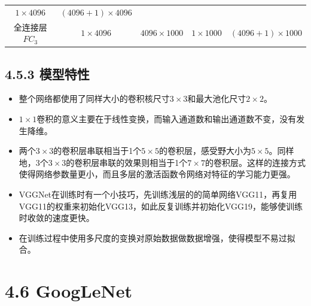 \begin{longtable}[]{ ccccc }
\begin{minipage}[t]{0.16\columnwidth}
\(1\times4096\)\strut
\end{minipage} & \begin{minipage}[t]{0.22\columnwidth}\centering\strut
\((4096+1)\times4096\)\strut
\end{minipage}\tabularnewline
\begin{minipage}[t]{0.16\columnwidth}\centering\strut
全连接层\(FC_{3}\)\strut
\end{minipage} & \begin{minipage}[t]{0.15\columnwidth}\centering\strut
\(1\times4096\)\strut
\end{minipage} & \begin{minipage}[t]{0.17\columnwidth}\centering\strut
\(4096\times1000\)\strut
\end{minipage} & \begin{minipage}[t]{0.16\columnwidth}\centering\strut
\(1\times1000\)\strut
\end{minipage} & \begin{minipage}[t]{0.22\columnwidth}\centering\strut
\((4096+1)\times1000\)\strut
\end{minipage}\tabularnewline
\bottomrule
\end{longtable}

\subsection{4.5.3 模型特性}\label{ux6a21ux578bux7279ux6027-3}

\begin{itemize}
\item
  整个网络都使用了同样大小的卷积核尺寸\(3\times3\)和最大池化尺寸\(2\times2\)。
\item
  \(1\times1\)卷积的意义主要在于线性变换，而输入通道数和输出通道数不变，没有发生降维。
\item
  两个\(3\times3\)的卷积层串联相当于1个\(5\times5\)的卷积层，感受野大小为\(5\times5\)。同样地，3个\(3\times3\)的卷积层串联的效果则相当于1个\(7\times7\)的卷积层。这样的连接方式使得网络参数量更小，而且多层的激活函数令网络对特征的学习能力更强。
\item
  VGGNet在训练时有一个小技巧，先训练浅层的的简单网络VGG11，再复用VGG11的权重来初始化VGG13，如此反复训练并初始化VGG19，能够使训练时收敛的速度更快。
\item
  在训练过程中使用多尺度的变换对原始数据做数据增强，使得模型不易过拟合。
\end{itemize}

\section{4.6 GoogLeNet}\label{googlenet}

